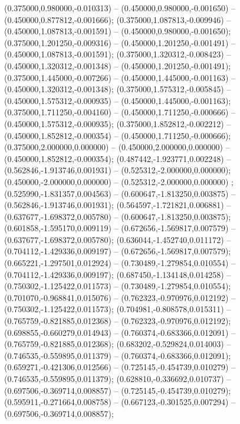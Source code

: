  (0.375000,0.980000,-0.010313) -- (0.450000,0.980000,-0.001650) -- (0.450000,0.877812,-0.001666);
 (0.375000,1.087813,-0.009946) -- (0.450000,1.087813,-0.001591) -- (0.450000,0.980000,-0.001650);
 (0.375000,1.201250,-0.009316) -- (0.450000,1.201250,-0.001491) -- (0.450000,1.087813,-0.001591);
 (0.375000,1.320312,-0.008423) -- (0.450000,1.320312,-0.001348) -- (0.450000,1.201250,-0.001491);
 (0.375000,1.445000,-0.007266) -- (0.450000,1.445000,-0.001163) -- (0.450000,1.320312,-0.001348);
 (0.375000,1.575312,-0.005845) -- (0.450000,1.575312,-0.000935) -- (0.450000,1.445000,-0.001163);
 (0.375000,1.711250,-0.004160) -- (0.450000,1.711250,-0.000666) -- (0.450000,1.575312,-0.000935);
 (0.375000,1.852812,-0.002212) -- (0.450000,1.852812,-0.000354) -- (0.450000,1.711250,-0.000666);
 (0.375000,2.000000,0.000000) -- (0.450000,2.000000,0.000000) -- (0.450000,1.852812,-0.000354);
 (0.487442,-1.923771,0.002248) -- (0.562846,-1.913746,0.001931) -- (0.525312,-2.000000,0.000000);
 (0.450000,-2.000000,0.000000) -- (0.525312,-2.000000,0.000000) ;
 (0.525990,-1.831357,0.004563) -- (0.600647,-1.813250,0.003875) -- (0.562846,-1.913746,0.001931);
 (0.564597,-1.721821,0.006881) -- (0.637677,-1.698372,0.005780) -- (0.600647,-1.813250,0.003875);
 (0.601858,-1.595170,0.009119) -- (0.672656,-1.569817,0.007579) -- (0.637677,-1.698372,0.005780);
 (0.636044,-1.452740,0.011172) -- (0.704112,-1.429336,0.009197) -- (0.672656,-1.569817,0.007579);
 (0.665221,-1.297501,0.012924) -- (0.730489,-1.279854,0.010554) -- (0.704112,-1.429336,0.009197);
 (0.687450,-1.134148,0.014258) -- (0.750302,-1.125422,0.011573) -- (0.730489,-1.279854,0.010554);
 (0.701070,-0.968841,0.015076) -- (0.762323,-0.970976,0.012192) -- (0.750302,-1.125422,0.011573);
 (0.704981,-0.808578,0.015311) -- (0.765759,-0.821885,0.012368) -- (0.762323,-0.970976,0.012192);
 (0.698855,-0.660279,0.014943) -- (0.760374,-0.683366,0.012091) -- (0.765759,-0.821885,0.012368);
 (0.683202,-0.529824,0.014003) -- (0.746535,-0.559895,0.011379) -- (0.760374,-0.683366,0.012091);
 (0.659271,-0.421306,0.012566) -- (0.725145,-0.454739,0.010279) -- (0.746535,-0.559895,0.011379);
 (0.628810,-0.336692,0.010737) -- (0.697506,-0.369714,0.008857) -- (0.725145,-0.454739,0.010279);
 (0.595911,-0.271664,0.008758) -- (0.667123,-0.301525,0.007294) -- (0.697506,-0.369714,0.008857);
